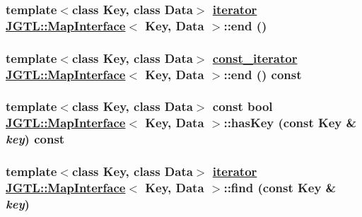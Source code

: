 \hypertarget{class_j_g_t_l_1_1_map_interface_b942b543e93621e8e6a84c8fcadb29fc}{
\subsubsection[end]{\setlength{\rightskip}{0pt plus 5cm}template$<$class Key, class Data$>$ \hyperlink{class_j_g_t_l_1_1_map_interface_a8fcdbd899d0df84ce1aaa67d8dc000e}{iterator} \hyperlink{class_j_g_t_l_1_1_map_interface}{JGTL::Map\-Interface}$<$ Key, Data $>$::end ()}}
\label{class_j_g_t_l_1_1_map_interface_b942b543e93621e8e6a84c8fcadb29fc}


\hypertarget{class_j_g_t_l_1_1_map_interface_8ce89dcb9cfb3d23d7123a8e7ad98633}{
\subsubsection[end]{\setlength{\rightskip}{0pt plus 5cm}template$<$class Key, class Data$>$ \hyperlink{class_j_g_t_l_1_1_map_interface_bbce6cc516069a5a504e0ae5b9aecd88}{const\_\-iterator} \hyperlink{class_j_g_t_l_1_1_map_interface}{JGTL::Map\-Interface}$<$ Key, Data $>$::end () const}}
\label{class_j_g_t_l_1_1_map_interface_8ce89dcb9cfb3d23d7123a8e7ad98633}


\hypertarget{class_j_g_t_l_1_1_map_interface_6a4c3571cb30d168d4a67dd2655a6b77}{
\subsubsection[hasKey]{\setlength{\rightskip}{0pt plus 5cm}template$<$class Key, class Data$>$ const bool \hyperlink{class_j_g_t_l_1_1_map_interface}{JGTL::Map\-Interface}$<$ Key, Data $>$::has\-Key (const Key \& {\em key}) const}}
\label{class_j_g_t_l_1_1_map_interface_6a4c3571cb30d168d4a67dd2655a6b77}


\hypertarget{class_j_g_t_l_1_1_map_interface_7e97b54c29a253bd99caf2b0decb95a8}{
\subsubsection[find]{\setlength{\rightskip}{0pt plus 5cm}template$<$class Key, class Data$>$ \hyperlink{class_j_g_t_l_1_1_map_interface_a8fcdbd899d0df84ce1aaa67d8dc000e}{iterator} \hyperlink{class_j_g_t_l_1_1_map_interface}{JGTL::Map\-Interface}$<$ Key, Data $>$::find (const Key \& {\em key})}}
\label{class_j_g_t_l_1_1_map_interface_7e97b54c29a253bd99caf2b0decb95a8}


